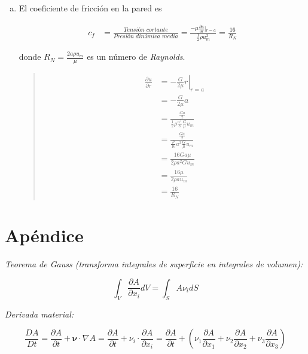 \documentclass[a4paper,10pt,twoside,final,spanish]{article}
\begin{document}
\begin{enumerate}[a.]
\item El coeficiente de fricción en la pared es

\begin{align*}
c_{f} &= \frac{\textit{Tensión cortante}}{\textit{Presión dinámica media}}
=\frac{-\mu\frac{\partial u}{\partial r}\left|_{r=a}\right.}{\frac{1}{2}\rho u_{m}^{2}}=\frac{16}{R_{N}}
\end{align*}

donde $\displaystyle R_{N}=\frac{2a\rho u_{m}}{\mu}$ es un número de \textit{Raynolds}.

\begin{quote}
\begin{tcolorbox}[colback=gray!10!white,colframe=black!0!white]

\begin{align*}
\frac{\partial u}{\partial r} &= \left.-\frac{G}{2\mu}r\right|_{r=a} \\
&= -\frac{G}{2\mu}a \\
&= \frac{\frac{Ga}{2}}{\frac{1}{2}\rho\frac{a^{2}}{8}\frac{G}{\mu}u_{m}} \\
&= \frac{\frac{Ga}{2}}{\frac{\rho}{16}a^{2}\frac{G}{\mu}u_{m}} \\
&= \frac{16Ga\mu}{2\rho a^{2}G u_{m}} \\
&= \frac{16\mu}{2\rho a u_{m}} \\
&= \frac{16}{R_{N}}
\end{align*}

\end{tcolorbox}
\end{quote}

\end{enumerate}

\section*{Apéndice}

\textit{Teorema de Gauss (transforma integrales de superficie en integrales de volumen):}

\begin{equation}
\int_{V}\frac{\partial A}{\partial x_{i}}dV=\int_{S}A\nu_{i}dS
\label{eq:tg}
\end{equation}

\vspace{1em}

\textit{Derivada material:}

\begin{equation}
\frac{DA}{Dt}=\frac{\partial A}{\partial t}+\mathbf{\nu}\cdot\nabla A
=\frac{\partial A}{\partial t}+\nu_{i}\cdot\frac{\partial A}{\partial x_{i}}
=\frac{\partial A}{\partial t}+\left(
\nu_{1}\frac{\partial A}{\partial x_{1}}
+\nu_{2}\frac{\partial A}{\partial x_{2}}
+\nu_{3}\frac{\partial A}{\partial x_{3}}
\right)
\label{eq:dm}
\end{equation}
\end{document}
